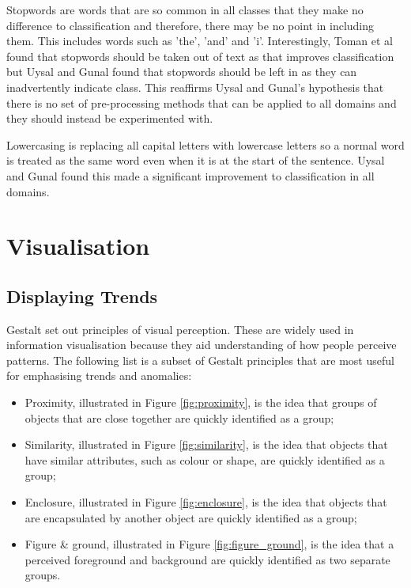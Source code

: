 			Stopwords are words that are so common in all classes that they make no difference to classification and therefore, there may be no point in including them. This includes words such as 'the', 'and' and 'i'. Interestingly, Toman et al found that stopwords should be taken out of text as that improves classification but Uysal and Gunal found that stopwords should be left in as they can inadvertently indicate class. This reaffirms Uysal and Gunal's hypothesis that there is no set of pre-processing methods that can be applied to all domains and they should instead be experimented with.
			
			Lowercasing is replacing all capital letters with lowercase letters so a normal word is treated as the same word even when it is at the start of the sentence. Uysal and Gunal found this made a significant improvement to classification in all domains.
	\section{Visualisation}
		\subsection{Displaying Trends}
			Gestalt set out principles of visual perception. These are widely used in information visualisation because they aid understanding of how people perceive patterns\cite{gestalt_graph_kobourov}. The following list is a subset of Gestalt principles that are most useful for emphasising trends and anomalies:
			
			\begin{itemize}
				\item Proximity, illustrated in Figure \ref{fig:proximity}, is the idea that groups of objects that are close together are quickly identified as a group;
				\item Similarity, illustrated in Figure \ref{fig:similarity}, is the idea that objects that have similar attributes, such as colour or shape, are quickly identified as a group;
				\item Enclosure, illustrated in Figure \ref{fig:enclosure}, is the idea that objects that are encapsulated by another object are quickly identified as a group;
				\item Figure \& ground, illustrated in Figure \ref{fig:figure_ground}, is the idea that a perceived foreground and background are quickly identified as two separate groups. 
			\end{itemize}
			
